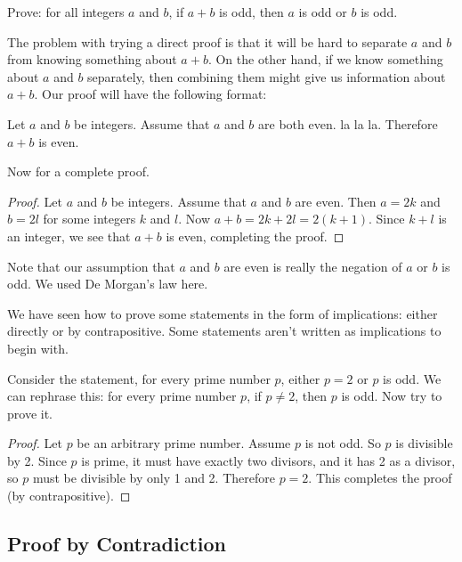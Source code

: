 \documentclass[12pt]{article}
\begin{document}
  \begin{example}
   Prove: for all integers $a$ and $b$, if $a + b$ is odd, then $a$ is odd or $b$ is odd.
   \begin{solution}
     The problem with trying a direct proof is that it will be hard to separate $a$ and $b$ from knowing something about $a+b$.  On the other hand, if we know something about $a$ and $b$ separately, then combining them might give us information about $a+b$.  Our proof will have the following format:

     Let $a$ and $b$ be integers.  Assume that $a$ and $b$ are both even.  la la la.  Therefore $a+b$ is even.

     Now for a complete proof.
     \begin{proof}
       Let $a$ and $b$ be integers.  Assume that $a$ and $b$ are even.  Then $a = 2k$ and $b = 2l$ for some integers $k$ and $l$.  Now $a + b = 2k + 2l = 2(k+1)$.  Since $k + l$ is an integer, we see that $a + b$ is even, completing the proof.
     \end{proof}

     Note that our assumption that $a$ and $b$ are even is really the negation of $a$ or $b$ is odd.  We used De Morgan's law here.
   \end{solution}
 \end{example}


We have seen how to prove some statements in the form of implications: either directly or by contrapositive.  Some statements aren't written as implications to begin with.

  \begin{example}
    Consider the statement, for every prime number $p$, either $p = 2$ or $p$ is odd.  We can rephrase this: for every prime number $p$, if $p \ne 2$, then $p$ is odd.  Now try to prove it.

    \begin{proof}
     Let $p$ be an arbitrary prime number.  Assume $p$ is not odd.  So $p$ is divisible by 2.  Since $p$ is prime, it must have exactly two divisors, and it has 2 as a divisor, so $p$ must be divisible by only 1 and 2.  Therefore $p = 2$.  This completes the proof (by contrapositive).
    \end{proof}

  \end{example}




\subsection*{Proof by Contradiction}
\end{document}
